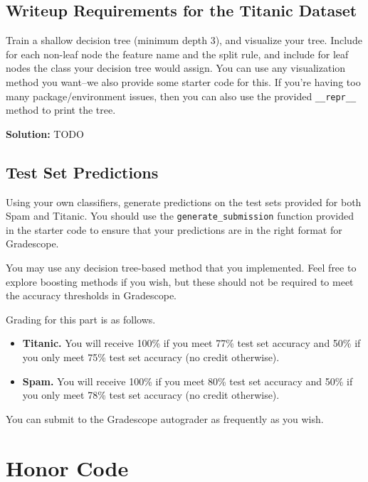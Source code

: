 \documentclass{article}
\newcommand{\Question}[1]{\Large \section{ #1 } \normalsize}
\newenvironment{solution}{\color{blue} \smallskip \textbf{Solution:}}{}
\begin{document}
\newpage
\subsection{Writeup Requirements for the Titanic Dataset}
Train a shallow decision tree (minimum depth $3$), and visualize your tree. 
Include for each non-leaf node the feature name and the split rule, and include for leaf nodes the class your decision tree would assign. 
You can use any visualization method you want--we also provide some starter code for this. 
If you're having too many package/environment issues, then you can also use the provided \verb|__repr__| method to print the tree.
	
\begin{solution}
    TODO
\end{solution}

\newpage
\subsection{Test Set Predictions}
Using your own classifiers, generate predictions on the test sets provided for both Spam and Titanic. 
You should use the \verb|generate_submission| function provided in the starter code to ensure that your predictions are in the right format for Gradescope. 

You may use any decision tree-based method that you implemented. 
Feel free to explore boosting methods if you wish, but these should not be required to meet the accuracy thresholds in Gradescope.

Grading for this part is as follows.
\begin{itemize}
    \item \textbf{Titanic.} You will receive 100\% if you meet 77\% test set accuracy and 50\% if you only meet 75\% test set accuracy (no credit otherwise).
    \item \textbf{Spam.} You will receive 100\% if you meet 80\% test set accuracy and 50\% if you only meet 78\% test set accuracy (no credit otherwise).
\end{itemize}
You can submit to the Gradescope autograder as frequently as you wish.


\newpage
\Question{Honor Code}
\end{document}

